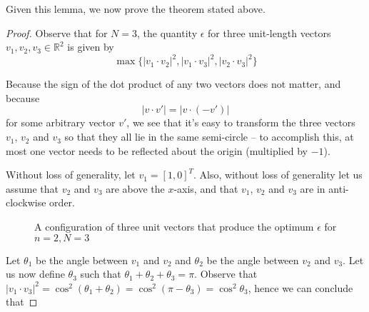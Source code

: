 \documentclass[11pt,letterpaper,twoside,english]{article}
\theoremstyle{theorem}
\theoremstyle{remark}
\begin{document}
Given this lemma, we now prove the theorem stated above.

\begin{proof}
Observe that for $N=3$, the quantity $\epsilon$ for three unit-length vectors $v_1, v_2, v_3 \in \mathbb{R}^2$ is given by $$\max \{ |v_1 \cdot v_2|^2, |v_1 \cdot v_3|^2, |v_2 \cdot v_3|^2 \}$$

Because the sign of the dot product of any two vectors does not matter, and because $$|v \cdot v'| = |v \cdot (-v')|$$ for some arbitrary vector $v'$, we see that it's easy to transform the three vectors $v_1$, $v_2$ and $v_3$ so that they all lie in the same semi-circle -- to accomplish this, at most one vector needs to be reflected about the origin (multiplied by $-1$).

Without loss of generality, let $v_1 = [1, 0]^T$. Also, without loss of generality let us assume that $v_2$ and $v_3$ are above the $x$-axis, and that $v_1$, $v_2$ and $v_3$ are in anti-clockwise order.

\begin{figure}[!h]
    \centering
    \caption{A configuration of three unit vectors that produce the optimum $\epsilon$ for $n=2, N=3$}
\end{figure}


Let $\theta_1$ be the angle between $v_1$ and $v_2$ and $\theta_2$ be the angle between $v_2$ and $v_3$. Let us now define $\theta_3$ such that $\theta_1 + \theta_2 + \theta_3 = \pi$. Observe that $|v_1 \cdot v_3|^2 = \cos^2(\theta_1 + \theta_2) = \cos^2 (\pi - \theta_3) = \cos^2 \theta_3$, hence we can conclude that


\end{proof}
\end{document}
